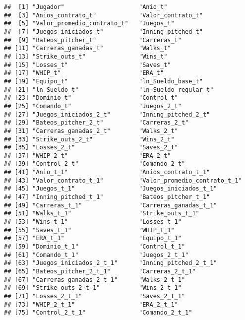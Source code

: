 \documentclass[
]{article}
\begin{document}
\begin{verbatim}
##  [1] "Jugador"                     "Anio_t"                     
##  [3] "Anios_contrato_t"            "Valor_contrato_t"           
##  [5] "Valor_promedio_contrato_t"   "Juegos_t"                   
##  [7] "Juegos_iniciados_t"          "Inning_pitched_t"           
##  [9] "Bateos_pitcher_t"            "Carreras_t"                 
## [11] "Carreras_ganadas_t"          "Walks_t"                    
## [13] "Strike_outs_t"               "Wins_t"                     
## [15] "Losses_t"                    "Saves_t"                    
## [17] "WHIP_t"                      "ERA_t"                      
## [19] "Equipo_t"                    "ln_Sueldo_base_t"           
## [21] "ln_Sueldo_t"                 "ln_Sueldo_regular_t"        
## [23] "Dominio_t"                   "Control_t"                  
## [25] "Comando_t"                   "Juegos_2_t"                 
## [27] "Juegos_iniciados_2_t"        "Inning_pitched_2_t"         
## [29] "Bateos_pitcher_2_t"          "Carreras_2_t"               
## [31] "Carreras_ganadas_2_t"        "Walks_2_t"                  
## [33] "Strike_outs_2_t"             "Wins_2_t"                   
## [35] "Losses_2_t"                  "Saves_2_t"                  
## [37] "WHIP_2_t"                    "ERA_2_t"                    
## [39] "Control_2_t"                 "Comando_2_t"                
## [41] "Anio_t_1"                    "Anios_contrato_t_1"         
## [43] "Valor_contrato_t_1"          "Valor_promedio_contrato_t_1"
## [45] "Juegos_t_1"                  "Juegos_iniciados_t_1"       
## [47] "Inning_pitched_t_1"          "Bateos_pitcher_t_1"         
## [49] "Carreras_t_1"                "Carreras_ganadas_t_1"       
## [51] "Walks_t_1"                   "Strike_outs_t_1"            
## [53] "Wins_t_1"                    "Losses_t_1"                 
## [55] "Saves_t_1"                   "WHIP_t_1"                   
## [57] "ERA_t_1"                     "Equipo_t_1"                 
## [59] "Dominio_t_1"                 "Control_t_1"                
## [61] "Comando_t_1"                 "Juegos_2_t_1"               
## [63] "Juegos_iniciados_2_t_1"      "Inning_pitched_2_t_1"       
## [65] "Bateos_pitcher_2_t_1"        "Carreras_2_t_1"             
## [67] "Carreras_ganadas_2_t_1"      "Walks_2_t_1"                
## [69] "Strike_outs_2_t_1"           "Wins_2_t_1"                 
## [71] "Losses_2_t_1"                "Saves_2_t_1"                
## [73] "WHIP_2_t_1"                  "ERA_2_t_1"                  
## [75] "Control_2_t_1"               "Comando_2_t_1"
\end{verbatim}
\end{document}
